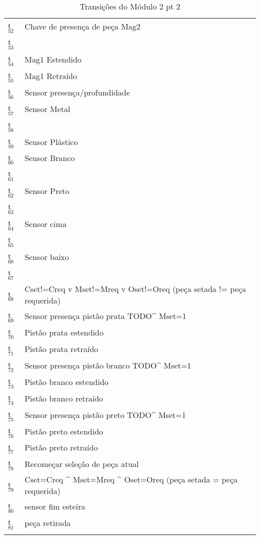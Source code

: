 \documentclass[11pt]{article}
\begin{document}
\begin{table}[htb]
\caption{Transições do Módulo 2 pt 2}
\centering
\begin{tabular}{ll}
t$_{\text{52}}$ & Chave de presença de peça Mag2\\
t$_{\text{53}}$ & \\
t$_{\text{54}}$ & Mag1 Estendido\\
t$_{\text{55}}$ & Mag1 Retraído\\
t$_{\text{56}}$ & Sensor presença/profundidade\\
t$_{\text{57}}$ & Sensor Metal\\
t$_{\text{58}}$ & \\
t$_{\text{59}}$ & Sensor Plástico\\
t$_{\text{60}}$ & Sensor Branco\\
t$_{\text{61}}$ & \\
t$_{\text{62}}$ & Sensor Preto\\
t$_{\text{63}}$ & \\
t$_{\text{64}}$ & Sensor cima\\
t$_{\text{65}}$ & \\
t$_{\text{66}}$ & Sensor baixo\\
t$_{\text{67}}$ & \\
t$_{\text{68}}$ & Cset!=Creq v Mset!=Mreq v Oset!=Oreq (peça setada != peça requerida)\\
t$_{\text{69}}$ & Sensor presença pistão prata TODO\^{} Mset=1\\
t$_{\text{70}}$ & Pistão prata estendido\\
t$_{\text{71}}$ & Pistão prata retraído\\
t$_{\text{72}}$ & Sensor presença pistão branco TODO\^{} Mset=1\\
t$_{\text{73}}$ & Pistão branco estendido\\
t$_{\text{74}}$ & Pistão branco retraído\\
t$_{\text{75}}$ & Sensor presença pistão preto TODO\^{} Mset=1\\
t$_{\text{76}}$ & Pistão preto estendido\\
t$_{\text{77}}$ & Pistão preto retraído\\
t$_{\text{78}}$ & Recomeçar seleção de peça atual\\
t$_{\text{79}}$ & Cset=Creq \^{} Mset=Mreq \^{} Oset=Oreq (peça setada = peça requerida)\\
t$_{\text{80}}$ & sensor fim esteira\\
t$_{\text{81}}$ & peça retirada\\
 & \\
\end{tabular}
\end{table}
\end{document}
